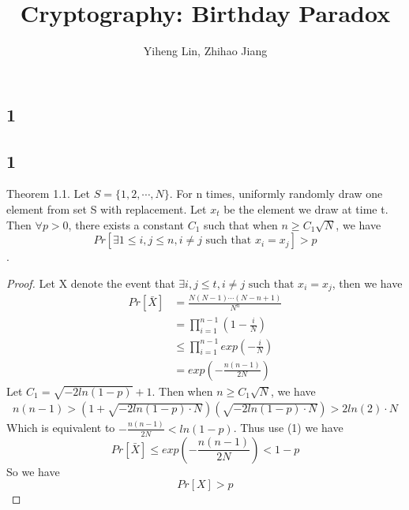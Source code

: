\documentclass{article}
\title{\textmd{\bf Cryptography: Birthday Paradox}}
\date{}
\author{Yiheng Lin, Zhihao Jiang}
\begin{document}
    \begin{spacing}{1.1}
    \maketitle %
    
    
    \section*{1}
    \subsection*{1}
    Theorem 1.1. Let $S = \{1, 2, \cdots, N\}$. For n times, uniformly randomly draw one element from set S with replacement. Let $x_t$ be the element we draw at time t. Then $\forall p > 0$, there exists a constant $C_1$ such that when $n \geq C_1 \sqrt{N}$, we have
    $$Pr[\exists 1\leq i, j \leq n, i\not = j \text{ such that } x_i = x_j] > p$$.
    \begin{proof}
        Let X denote the event that $\exists i, j \leq t, i\not = j \text{ such that } x_i = x_j$, then we have
        \begin{equation}
            \begin{aligned}
                Pr[\bar{X}] &= \frac{N(N-1)\cdots (N-n+1)}{N^n}\\
                &= \prod_{i=1}^{n-1}(1 - \frac{i}{N})\\
                &\leq \prod_{i=1}^{n-1} exp(-\frac{i}{N})\\
                &= exp(-\frac{n(n-1)}{2N})
            \end{aligned}
        \end{equation}
        Let $C_1 = \sqrt{-2ln(1 - p)} + 1$. Then when $n \geq C_1\sqrt{N}$, we have
        \begin{equation}
            \begin{aligned}
                n(n-1) > (1 + \sqrt{-2ln(1 - p)\cdot N})(\sqrt{-2ln(1 - p)\cdot N}) > 2ln(2)\cdot N
            \end{aligned}
        \end{equation}
        Which is equivalent to $-\frac{n(n-1)}{2N} < ln(1 - p)$.
        Thus use (1) we have
        $$Pr[\bar{X}] \leq exp(-\frac{n(n-1)}{2N}) < 1 - p$$
        So we have
        $$Pr[X] > p$$
    \end{proof}

\end{spacing}
\end{document}
